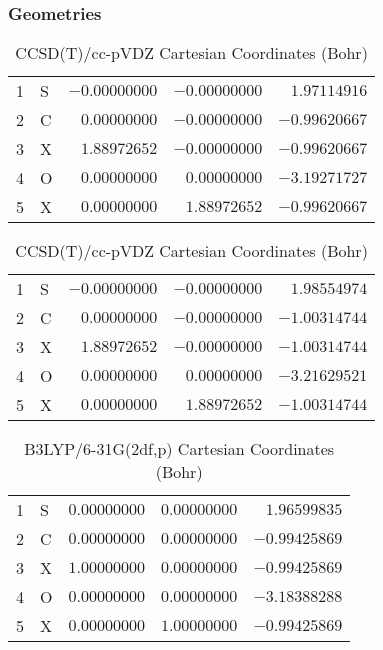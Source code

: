\documentclass[10pt,oneside]{article}
\begin{document}
\begin{table}[h!]
\subsubsection*{Geometries}
\begin{multicols}{2}
\centering
\caption{CCSD(T)/cc-pVTZ Cartesian Coordinates (Bohr)}
\begin{tabular}{llrrr}
\toprule
1  & S  & $-0.00000000$ & $-0.00000000$ & $ 1.97114916$ \\
2  & C  & $ 0.00000000$ & $-0.00000000$ & $-0.99620667$ \\
3  & X  & $ 1.88972652$ & $-0.00000000$ & $-0.99620667$ \\
4  & O  & $ 0.00000000$ & $ 0.00000000$ & $-3.19271727$ \\
5  & X  & $ 0.00000000$ & $ 1.88972652$ & $-0.99620667$ \\
\bottomrule
\end{tabular}
\caption{CCSD(T)/cc-pVDZ Cartesian Coordinates (Bohr)}
\begin{tabular}{llrrr}
\toprule
1  & S  & $-0.00000000$ & $-0.00000000$ & $ 1.98554974$ \\
2  & C  & $ 0.00000000$ & $-0.00000000$ & $-1.00314744$ \\
3  & X  & $ 1.88972652$ & $-0.00000000$ & $-1.00314744$ \\
4  & O  & $ 0.00000000$ & $ 0.00000000$ & $-3.21629521$ \\
5  & X  & $ 0.00000000$ & $ 1.88972652$ & $-1.00314744$ \\
\bottomrule
\end{tabular}
\end{multicols}
\end{table}

\begin{table}[h]
\centering
\caption{B3LYP/6-31G(2df,p) Cartesian Coordinates (Bohr)}
\begin{tabular}{llrrr}
\toprule
1  & S  & $ 0.00000000$ & $ 0.00000000$ & $ 1.96599835$ \\
2  & C  & $ 0.00000000$ & $ 0.00000000$ & $-0.99425869$ \\
3  & X  & $ 1.00000000$ & $ 0.00000000$ & $-0.99425869$ \\
4  & O  & $ 0.00000000$ & $ 0.00000000$ & $-3.18388288$ \\
5  & X  & $ 0.00000000$ & $ 1.00000000$ & $-0.99425869$ \\
\bottomrule
\end{tabular}
\end{table}
\end{document}
